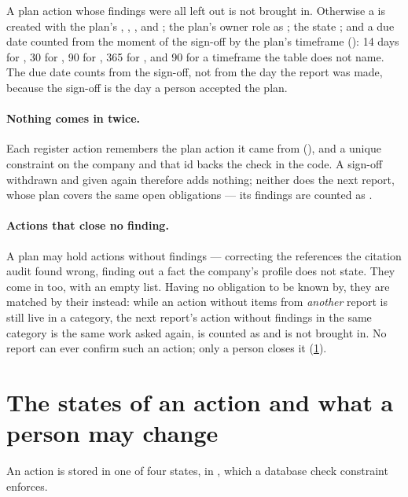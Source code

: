 A plan action whose findings were all left out is not brought in. Otherwise a
 is created with the plan's , ,
,  and ; the plan's owner role as ;
the state ; and a due date counted from the moment of the sign-off by the plan's
timeframe (): 14 days for , 30 for , 90 for
, 365 for , and 90 for a timeframe the table does not name. The due
date counts from the sign-off, not from the day the report was made, because the sign-off is
the day a person accepted the plan.

\paragraph{Nothing comes in twice.} Each register action remembers the plan action it came
from (), and a unique constraint on the company and that id backs the
check in the code. A sign-off withdrawn and given again therefore adds nothing; neither does
the next report, whose plan covers the same open obligations --- its findings are counted as
.

\paragraph{Actions that close no finding.} A plan may hold actions without findings ---
correcting the references the citation audit found wrong, finding out a fact the company's
profile does not state. They come in too, with an empty  list. Having no
obligation to be known by, they are matched by their  instead: while an
action without items from \emph{another} report is still live in a category, the next
report's action without findings in the same category is the same work asked again, is
counted as  and is not brought in. No report can ever confirm such an action;
only a person closes it (\cref{sec:register:states}).


\section{The states of an action and what a person may change}\label{sec:register:states}

An action is stored in one of four states,  in
, which a database check constraint enforces.

